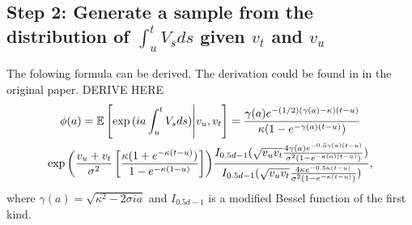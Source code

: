     \subsection*{Step 2: Generate a sample from the distribution of $\int_{u}^t V_s ds$ given $v_t$ and $v_u$}
        The folowing formula can be derived. {\color{red}The derivation could be found in in the original paper. DERIVE HERE}
        \begin{multline}
            \phi(a) = \mathbb{E}\left[  \exp{(ia\int_{u}^t V_s ds)} \Bigg| v_u, v_t\right] = \frac{\gamma(a)e^{-(1/2)(\gamma(a) - \kappa)(t - u)}}{\kappa(1-e^{-\gamma(a)(t-u)})} \\
            \exp{\left(\frac{v_u + v_t}{\sigma^2} \left[  \frac{\kappa(1+e^{-\kappa(t-u)})}{1-e^{-\kappa(1-u)}}                 \right]     \right)}
            \frac{I_{0.5d-1}(\sqrt{v_uv_t}\frac{4\gamma(a)e^{-0.5\gamma(a)(t-u)}}{\sigma^2(1-e^{-\kappa(a)(t-u)})})}{I_{0.5d-1}(\sqrt{v_uv_t}\frac{4\kappa e^{-0.5\kappa(t-u)}}{\sigma^2(1-e^{-\kappa(t-u)})})},
        \end{multline}
        where $\gamma(a) = \sqrt{\kappa^2 - 2\sigma i a}$ and $I_{0.5d-1}$ is a modified  Bessel function of the first kind.

